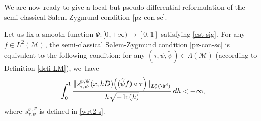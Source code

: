 We are now ready to give a local but pseudo-differential reformulation of the semi-classical Salem-Zygmund condition \eqref{pz-con-sc}.

\begin{prop}\label{wrt2}
Let us fix a smooth function $\Psi:[0,+\infty)\to [0,1]$ satisfying \eqref{est-sig}.
For any $f\in L^2(\mathcal{M})$, the semi-classical Salem-Zygmund condition \eqref{pz-con-sc} is equivalent to the following condition: for any $(\tau,\psi,\widetilde{\psi})\in \Lambda(\mathcal{M})$ (according to Definition \ref{defi-LM}), we~have
\begin{equation}\label{pz-con-loc}
\int_{0}^1 \frac{\|s_{\tau,\psi}^{\wp,\Psi}(x,hD)\Big((\widetilde{\psi}f)\circ \tau\Big)\|_{L_x^2(\R^d)}}{h\sqrt{-\ln(h)}} \,dh <+\infty,
\end{equation}
where $s_{\tau,\psi}^{\wp,\Psi}$ is defined in \eqref{wrt2-s}.
\end{prop}
